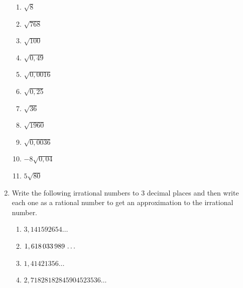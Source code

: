 \begin{eocexercises}{}
\begin{enumerate}[itemsep=5pt, label=\textbf{\arabic*}. ]
    \begin{enumerate}[itemsep=5pt, label=\textbf{\alph*}. ] 
    \item $\sqrt{8}$
    \item $\sqrt{768}$
    \item $\sqrt{100}$
    \item $\sqrt{0,49}$
    \item $\sqrt{0,0016}$
    \item $\sqrt{0,25}$
    \item $\sqrt{36}$
    \item $\sqrt{1960}$
    \item $\sqrt{0,0036}$
    \item $-8\sqrt{0,04}$
    \item $5\sqrt{80}$
    \end{enumerate}
\item Write the following irrational numbers to $3$ decimal places and then write each one as a rational number to get an approximation to the irrational number.
    \begin{enumerate}[itemsep=5pt, label=\textbf{\alph*}. ] 
    \item $3,141592654\ldots$
    \item $1,618\phantom{\rule{0.166667em}{0ex}}033\phantom{\rule{0.166667em}{0ex}}989\phantom{\rule{0.166667em}{0ex}}\ldots$
    \item $1,41421356\ldots$
    \item $2,71828182845904523536\ldots$
    \end{enumerate}




\end{enumerate}
\end{eocexercises}
